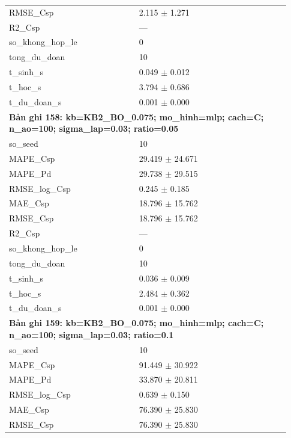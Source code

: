 \begin{longtable}{p{0.43\linewidth}p{0.50\linewidth}}
RMSE\_\allowbreak Csp & 2.115 $\pm$ 1.271 \\
R2\_\allowbreak Csp & — \\
so\_\allowbreak khong\_\allowbreak hop\_\allowbreak le & 0 \\
tong\_\allowbreak du\_\allowbreak doan & 10 \\
t\_\allowbreak sinh\_\allowbreak s & 0.049 $\pm$ 0.012 \\
t\_\allowbreak hoc\_\allowbreak s & 3.794 $\pm$ 0.686 \\
t\_\allowbreak du\_\allowbreak doan\_\allowbreak s & 0.001 $\pm$ 0.000 \\
\midrule
\multicolumn{2}{p{0.95\linewidth}}{\textbf{Bản ghi 158: kb=KB2\_BO\_0.075; mo\_hinh=mlp; cach=C; n\_ao=100; sigma\_lap=0.03; ratio=0.05}} \\
so\_\allowbreak seed & 10 \\
MAPE\_\allowbreak Csp & 29.419 $\pm$ 24.671 \\
MAPE\_\allowbreak Pd & 29.738 $\pm$ 29.515 \\
RMSE\_\allowbreak log\_\allowbreak Csp & 0.245 $\pm$ 0.185 \\
MAE\_\allowbreak Csp & 18.796 $\pm$ 15.762 \\
RMSE\_\allowbreak Csp & 18.796 $\pm$ 15.762 \\
R2\_\allowbreak Csp & — \\
so\_\allowbreak khong\_\allowbreak hop\_\allowbreak le & 0 \\
tong\_\allowbreak du\_\allowbreak doan & 10 \\
t\_\allowbreak sinh\_\allowbreak s & 0.036 $\pm$ 0.009 \\
t\_\allowbreak hoc\_\allowbreak s & 2.484 $\pm$ 0.362 \\
t\_\allowbreak du\_\allowbreak doan\_\allowbreak s & 0.001 $\pm$ 0.000 \\
\midrule
\multicolumn{2}{p{0.95\linewidth}}{\textbf{Bản ghi 159: kb=KB2\_BO\_0.075; mo\_hinh=mlp; cach=C; n\_ao=100; sigma\_lap=0.03; ratio=0.1}} \\
so\_\allowbreak seed & 10 \\
MAPE\_\allowbreak Csp & 91.449 $\pm$ 30.922 \\
MAPE\_\allowbreak Pd & 33.870 $\pm$ 20.811 \\
RMSE\_\allowbreak log\_\allowbreak Csp & 0.639 $\pm$ 0.150 \\
MAE\_\allowbreak Csp & 76.390 $\pm$ 25.830 \\
RMSE\_\allowbreak Csp & 76.390 $\pm$ 25.830 \\

\end{longtable}

